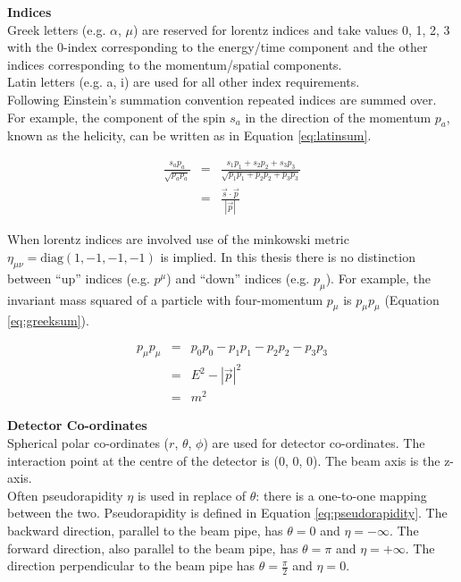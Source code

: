 {\bf Indices} \\

Greek letters (e.g. $\alpha$, $\mu$) are reserved for lorentz indices and take
values 0, 1, 2, 3 with the 0-index corresponding to the energy/time component
and the other indices corresponding to the momentum/spatial components. \\

Latin letters (e.g. a, i) are used for all other index requirements. \\

Following Einstein's summation convention repeated indices are summed over. For 
example, the component of the spin $s_{a}$ in the direction of the momentum 
$p_{a}$, known as the helicity, can be written as in Equation \ref{eq:latinsum}.

\begin{eqnarray}
\frac{s_{a}p_{a}}{\sqrt{p_{a}p_{a}}} &=& \frac{s_{1}p_{1} + s_{2}p_{2} + s_{3}p_{3}}
{\sqrt{p_{1}p_{1} + p_{2}p_{2} + p_{3}p_{3}}} \nonumber \\
&=& \frac{\vec{s}\cdot\vec{p}}{|\vec{p}|}
\label{eq:latinsum}
\end{eqnarray}

When lorentz indices are involved use of the minkowski metric $\eta_{\mu\nu} =
\mathrm{diag}(1, -1, -1, -1)$ is implied. In this thesis there is no distinction 
between ``up'' indices (e.g. $p^{\mu}$) and ``down'' indices (e.g. $p_{\mu}$). 
For example, the invariant mass squared of a particle with four-momentum 
$p_{\mu}$ is $p_{\mu}p_{\mu}$ (Equation \ref{eq:greeksum}). 

\begin{eqnarray}
p_{\mu}p_{\mu} &=& p_{0}p_{0} - p_{1}p_{1} - p_{2}p_{2} - p_{3}p_{3} \nonumber
\\
&=& E^{2} - |\vec{p}|^{2} \nonumber \\
&=& m^{2}
\label{eq:greeksum}
\end{eqnarray}

{\bf Detector Co-ordinates} \\

Spherical polar co-ordinates ($r$, $\theta$, $\phi$) are used for detector
co-ordinates. The interaction point at the centre of the detector is (0, 0, 0).
The beam axis is the z-axis. \\

Often pseudorapidity $\eta$ is used in replace of $\theta$: there is a 
one-to-one mapping between the two. Pseudorapidity is defined in Equation 
\ref{eq:pseudorapidity}. The backward direction, parallel to the beam pipe, has 
$\theta = 0$ and $\eta = -\infty$. The forward direction, also parallel to the
beam pipe, has $\theta = \pi$ and $\eta = +\infty$. The direction perpendicular 
to the beam pipe has $\theta = \frac{\pi}{2}$ and $\eta = 0$. 

